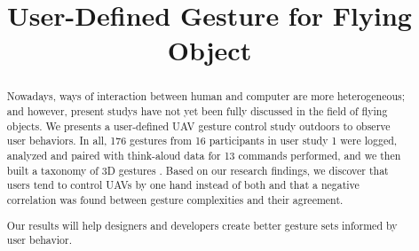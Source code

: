 \documentclass{sigchi}
\begin{document}
\title{User-Defined Gesture for Flying Object}

\maketitle

\begin{abstract}
Nowadays, ways of interaction between human and computer are more heterogeneous; and however, present studys have not yet been fully discussed in the field of flying objects. We presents a user-defined UAV gesture control study outdoors to observe user behaviors. In all, 176 gestures from 16 participants in user study 1 were logged, analyzed and paired with think-aloud data for 13 commands performed, and we then built a taxonomy of 3D gestures . Based on our research findings, we discover that users tend to control UAVs by one hand instead of both and that a negative correlation was found between gesture complexities and their agreement.

Our results will help designers and developers create better gesture sets informed by user behavior.
\end{abstract}
\end{document}
